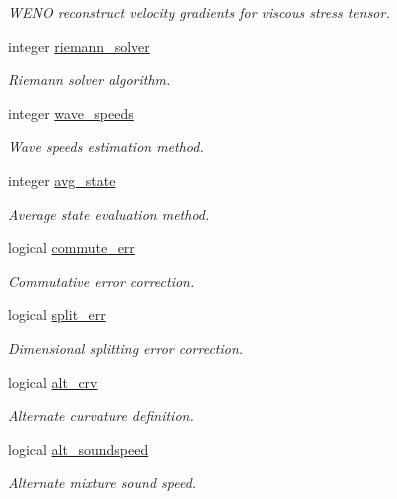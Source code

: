 \begin{DoxyCompactItemize}
\begin{DoxyCompactList}\small\item\em W\+E\+NO reconstruct velocity gradients for viscous stress tensor. \end{DoxyCompactList}\item 
integer \hyperlink{namespacem__global__parameters_a6b9c81f07f8444654924e3075e4edaf8}{riemann\+\_\+solver}
\begin{DoxyCompactList}\small\item\em Riemann solver algorithm. \end{DoxyCompactList}\item 
integer \hyperlink{namespacem__global__parameters_a0f798e4b3d19b7d49d747cc89cbe0b69}{wave\+\_\+speeds}
\begin{DoxyCompactList}\small\item\em Wave speeds estimation method. \end{DoxyCompactList}\item 
integer \hyperlink{namespacem__global__parameters_a1a3314b39e21e17d7e72a9837db2ab42}{avg\+\_\+state}
\begin{DoxyCompactList}\small\item\em Average state evaluation method. \end{DoxyCompactList}\item 
logical \hyperlink{namespacem__global__parameters_a5a340deb003a37dc81b7a560343242b1}{commute\+\_\+err}
\begin{DoxyCompactList}\small\item\em Commutative error correction. \end{DoxyCompactList}\item 
logical \hyperlink{namespacem__global__parameters_a9adf65c5de7c360aa44f595f561c87b0}{split\+\_\+err}
\begin{DoxyCompactList}\small\item\em Dimensional splitting error correction. \end{DoxyCompactList}\item 
logical \hyperlink{namespacem__global__parameters_a3805bb400f71c84b76e3111dd595648d}{alt\+\_\+crv}
\begin{DoxyCompactList}\small\item\em Alternate curvature definition. \end{DoxyCompactList}\item 
logical \hyperlink{namespacem__global__parameters_a5a19b6ba65c32dfc21f4762eceb25f29}{alt\+\_\+soundspeed}
\begin{DoxyCompactList}\small\item\em Alternate mixture sound speed. \end{DoxyCompactList}\item 

\end{DoxyCompactItemize}
